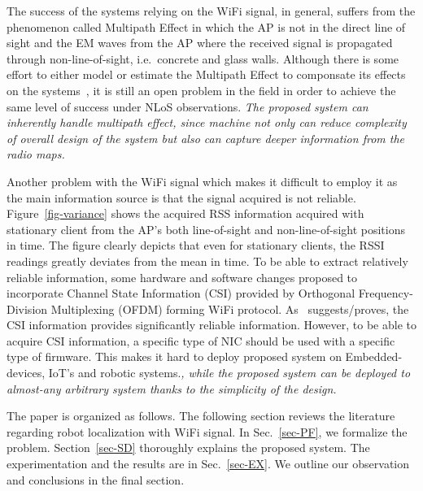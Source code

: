 \documentclass[conference]{IEEEtran}
\begin{document}
  The success of the systems relying on the WiFi signal, in general, suffers from the phenomenon called Multipath Effect in which the AP is not in the direct line of sight and the EM waves from the AP where the received signal is propagated through non-line-of-sight, i.e.~concrete and glass walls.
  Although there is some effort to either model or estimate the Multipath Effect to componsate its effects on the systems~\cite{cai2015identification}, it is still an open problem in the field in order to achieve the same level of success under NLoS observations.
  \textit{The proposed system can inherently handle multipath effect, since machine not only can reduce complexity of overall design of the system but also can capture deeper information from the radio maps.}

  Another problem with the WiFi signal which makes it difficult to employ it as the main information source is that the signal acquired is not reliable.
  Figure~\ref{fig-variance} shows the acquired RSS information acquired with stationary client from the AP's both line-of-sight and non-line-of-sight positions in time.
  The figure clearly depicts that even for stationary clients, the RSSI readings greatly deviates from the mean in time.
  To be able to extract relatively reliable information, some hardware and software changes proposed to incorporate Channel State Information (CSI) provided by Orthogonal Frequency-Division Multiplexing (OFDM) forming WiFi protocol.
  As~\cite{gao2015channel} suggests/proves, the CSI information provides significantly reliable information.
  However, to be able to acquire CSI information, a specific type of NIC should be used with a specific type of firmware.
  This makes it hard to deploy proposed system on Embedded-devices, IoT's and robotic systems.\textit{, while the proposed system can be deployed to almost-any arbitrary system thanks to the simplicity of the design.}


  The paper is organized as follows.
  The following section reviews the literature regarding robot localization with WiFi signal.
  In Sec.~\ref{sec-PF}, we formalize the problem.
  Section~\ref{sec-SD} thoroughly explains the proposed system.
  The experimentation and the results are  in Sec.~\ref{sec-EX}.
  We outline our observation and conclusions in the final section.
\end{document}
